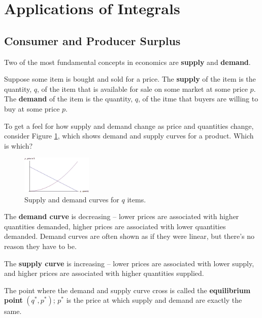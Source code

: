 \section{Applications of Integrals}
\label{sec:integral-applications}


\subsection{Consumer and Producer Surplus}
Two of the most fundamental concepts in economics are {\bf supply} and {\bf demand}.
\begin{definition}
Suppose some item is bought and sold for a price. The {\bf supply} of the item is the quantity, $q$, of the item that is available for sale on some market at some price $p$. The {\bf demand} of the item is the quantity, $q$, of the itme that buyers are willing to buy at some price $p$.
\end{definition}
To get a feel for how supply and demand change as price and quantities change, consider Figure \ref{fig:5-8-supplyDemand}, which shows demand and supply curves for a product. Which is which?

\begin{figure}[!ht]
  \centering
    \includegraphics[width=0.3\textwidth]{img/chap5/image062.png}
    \caption{Supply and demand curves for $q$ items.}
    \label{fig:5-8-supplyDemand}
\end{figure}
The {\bf demand curve} is decreasing -- lower prices are associated with higher quantities demanded, higher prices are associated with lower quantities demanded. Demand curves are often shown as if they were linear, but there's no reason they have to be.

The {\bf supply curve} is increasing -- lower prices are associated with lower supply, and higher prices are associated with higher quantities supplied.

The point where the demand and supply curve cross is called the {\bf equilibrium point} $(q^{*},p^{*})$; $p^{*}$ is the price at which supply and demand are exactly the same.

